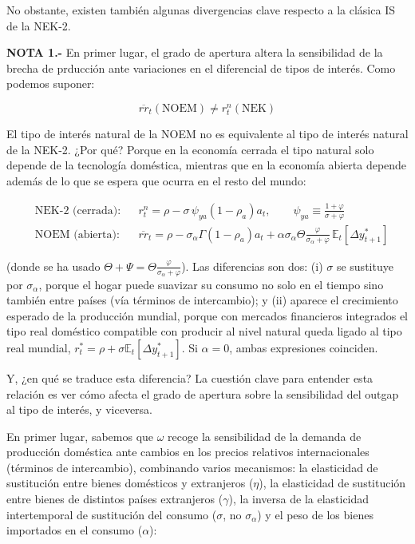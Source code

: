 \documentclass[10pt,a4paper]{article}
\begin{document}
No obstante, existen también algunas divergencias clave respecto a la clásica IS de la NEK-2. 


\textbf{NOTA 1.-} En primer lugar, el grado de apertura altera la sensibilidad de la brecha de prducción ante variaciones en el diferencial de tipos de interés. Como podemos suponer:

$$\overline{rr}_t(\text{NOEM})\neq r_t^n(\text{NEK})$$

El tipo de interés natural de la NOEM no es equivalente al tipo de interés natural de la NEK-2. ¿Por qué? Porque en la economía cerrada el tipo natural solo depende de la tecnología doméstica, mientras que en la economía abierta depende además de lo que se espera que ocurra en el resto del mundo:

$$\begin{aligned}
    &\text{NEK-2 (cerrada)}:&&r_t^n=\rho-\sigma\,\psi_{ya}(1-\rho_a)a_t,\qquad \psi_{ya}\equiv\frac{1+\varphi}{\sigma+\varphi}\\[0.5em]
    &\text{NOEM (abierta)}:&&\overline{rr}_t=\rho-\sigma_\alpha\Gamma(1-\rho_a)a_t+\alpha\sigma_\alpha\Theta\frac{\varphi}{\sigma_\alpha+\varphi}\,\mathbb E_t[\Delta y_{t+1}^*]
\end{aligned}$$

(donde se ha usado $\Theta+\Psi=\Theta\frac{\varphi}{\sigma_\alpha+\varphi}$). Las diferencias son dos: (i) $\sigma$ se sustituye por $\sigma_\alpha$, porque el hogar puede suavizar su consumo no solo en el tiempo sino también entre países (vía términos de intercambio); y (ii) aparece el crecimiento esperado de la producción mundial, porque con mercados financieros integrados el tipo real doméstico compatible con producir al nivel natural queda ligado al tipo real mundial, $r_t^*=\rho+\sigma\mathbb E_t[\Delta y_{t+1}^*]$. Si $\alpha=0$, ambas expresiones coinciden.

Y, ¿en qué se traduce esta diferencia? La cuestión clave para entender esta relación es ver cómo afecta el grado de apertura sobre la sensibilidad del outgap al tipo de interés, y viceversa. 

En primer lugar, sabemos que $\omega$ recoge la sensibilidad de la demanda de producción doméstica ante cambios en los precios relativos internacionales (términos de intercambio), combinando varios mecanismos: la elasticidad de sustitución entre bienes domésticos y extranjeros ($\eta$), la elasticidad de sustitución entre bienes de distintos países extranjeros ($\gamma$), la inversa de la elasticidad intertemporal de sustitución del consumo ($\sigma$, no $\sigma_\alpha$) y el peso de los bienes importados en el consumo ($\alpha$):
\end{document}

